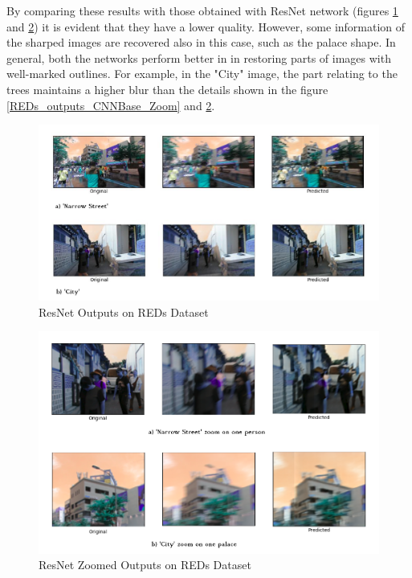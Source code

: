 \documentclass[12pt,a4paper]{article}
\begin{document}
 
By comparing these results with those obtained with ResNet network (figures \ref{REDs_ResNet_Outputs} and \ref{REDs_ResNet_Outputs_Zoom}) it is evident that they have a lower quality. However, some information of the sharped images are recovered also in this case, such as the palace shape. In general, both the networks perform better in in restoring parts of images with well-marked outlines. For example, in the "City" image, the part relating to the trees maintains a higher blur than the details shown in the figure \ref{REDs_outputs_CNNBase_Zoom} and \ref{REDs_ResNet_Outputs_Zoom}.


\begin{figure}[hptb]
\centering
\includegraphics[scale=0.5]{REDs_ResNet_Outputs.png} 
\caption{ResNet Outputs on REDs Dataset}
\label{REDs_ResNet_Outputs}
\end{figure}

\begin{figure}[hptb]
\centering
\includegraphics[scale=0.35]{REDs_ResNet_Outputs_Zoom.png} 
\caption{ResNet Zoomed Outputs on REDs Dataset}
\label{REDs_ResNet_Outputs_Zoom}
\end{figure}
\end{document}
